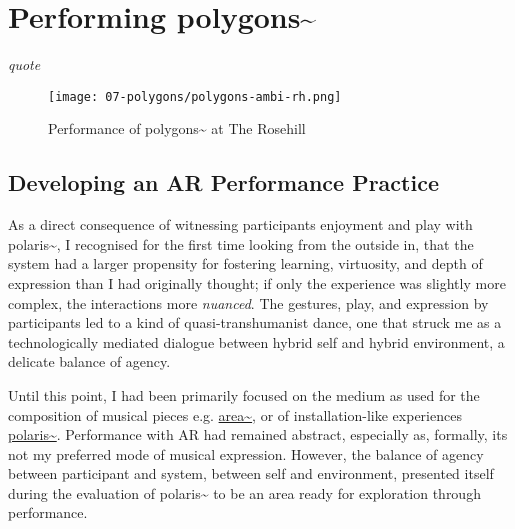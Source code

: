\chapter{Performing polygons\textasciitilde{}}
\label{sec: polygons}
\epigraph{\emph{quote}}{\citep[]{bilbow2022}}
\begin{figure}
    \centering
    \texttt{[image: 07-polygons/polygons-ambi-rh.png]}
    \caption{Performance of polygons\textasciitilde{} at The Rosehill}
    \label{fig: polygons-ambi-rh}
\end{figure}
\section{Developing an AR Performance Practice} \label{sec: polygons-developing}
As a direct consequence of witnessing participants enjoyment and play with polaris\textasciitilde{}, I recognised for the first time looking from the outside in, that the system had a larger propensity for fostering learning, virtuosity, and depth of expression than I had originally thought; if only the experience was slightly more complex, the interactions more \textit{nuanced}. The gestures, play, and expression by participants led to a kind of quasi-transhumanist dance, one that struck me as a technologically mediated dialogue between hybrid self and hybrid environment, a delicate balance of agency.

Until this point, I had been primarily focused on the medium as used for the composition of musical pieces e.g. \hyperref[sec: area]{area\textasciitilde{}}, or of installation-like experiences \hyperref[sec: polaris]{polaris\textasciitilde{}}. Performance with AR had remained abstract, especially as, formally, its not my preferred mode of musical expression. However, the balance of agency between participant and system, between self and environment, presented itself during the evaluation of polaris\textasciitilde{} to be an area ready for exploration through performance. 

